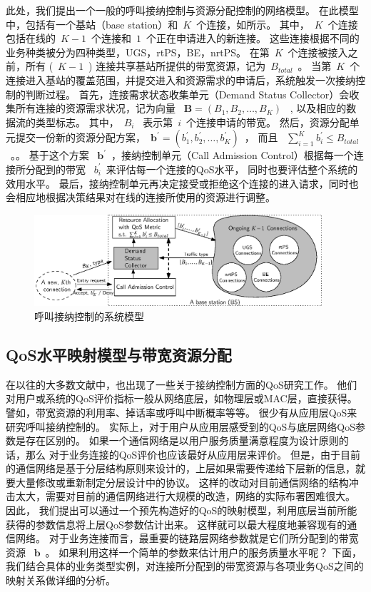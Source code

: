 此处，我们提出一个一般的呼叫接纳控制与资源分配控制的网络模型。
在此模型中，包括有一个基站（base station）和~$K$~个连接，如所示。
其中，~$K$~个连接包括在线的~$K-1$~个连接和~$1$~个正在申请进入的新连接。
这些连接根据不同的业务种类被分为四种类型，UGS，rtPS，BE，nrtPS。
在第~$K$~个连接被接入之前，所有 (~$K-1$~) 连接共享基站所提供的带宽资源，记为~$B_{total}$~。
当第~$K$~个连接进入基站的覆盖范围，并提交进入和资源需求的申请后，系统触发一次接纳控制的判断过程。
首先，连接需求状态收集单元（Demand Status Collector）会收集所有连接的资源需求状况，记为向量 ~$\mathbf{B} = (B_1, B_2, \dots, B_{K})$~ , 以及相应的数据流的类型标志。
其中，~$B_i$~ 表示第~$i$~个连接申请的带宽。
然后，资源分配单元提交一份新的资源分配方案，~$\mathbf{b^\prime} = (b_1^\prime, b_2^\prime, \dots, b_K^\prime)$~， 而且 ~$\sum_{i=1}^K b_i^\prime \le B_{total}$~。。
基于这个方案 ~$\mathbf{b^\prime}$~，接纳控制单元（Call Admission Control）根据每一个连接所分配到的带宽 ~$b_i^\prime$~来评估每一个连接的QoS水平，
同时也要评估整个系统的效用水平。
最后，接纳控制单元再决定接受或拒绝这个连接的进入请求，同时也会相应地根据决策结果对在线的连接所使用的资源进行调整。
\begin{figure}[t]
\centering
\includegraphics[width=0.95\textwidth]{cacop_qos_model_system.eps}
\caption{ 呼叫接纳控制的系统模型} \label{fig_system_model_cac}
\end{figure}
\subsection{QoS水平映射模型与带宽资源分配}
在以往的大多数文献中，也出现了一些关于接纳控制方面的QoS研究工作。
他们对用户或系统的QoS评价指标一般从网络底层，如物理层或MAC层，直接获得。
譬如，带宽资源的利用率、掉话率或呼叫中断概率等等。
很少有从应用层QoS来研究呼叫接纳控制的。
实际上，对于用户从应用层感受到的QoS与底层网络QoS参数是存在区别的。
如果一个通信网络是以用户服务质量满意程度为设计原则的话，那么
对于业务连接的QoS评价也应该最好从应用层来评价。
但是，由于目前的通信网络是基于分层结构原则来设计的，上层如果需要传递给下层新的信息，就要大量修改或重新制定分层设计中的协议。
这样的改动对目前通信网络的结构冲击太大，需要对目前的通信网络进行大规模的改造，网络的实际布署困难很大。
因此，
我们提出可以通过一个预先构造好的QoS的映射模型，利用底层当前所能获得的参数信息将上层QoS参数估计出来。
这样就可以最大程度地兼容现有的通信网络。
对于业务连接而言，最重要的链路层网络参数就是它们所分配到的带宽资源 ~$\mathbf{b}$~。
如果利用这样一个简单的参数来估计用户的服务质量水平呢？ 
下面，我们结合具体的业务类型实例，对连接所分配到的带宽资源与各项业务QoS之间的映射关系做详细的分析。

